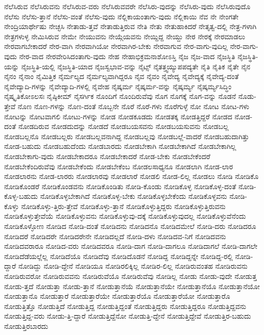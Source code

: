 {ನೆಲೆಸಿರುವ
ನೆಲೆಸಿರುವನು
ನೆಲೆಸಿರುವ-ವರು
ನೆಲೆಸಿರುವವರೇ
ನೆಲೆಸಿರು-ವುದನ್ನು
ನೆಲೆಸಿರು-ವುದು
ನೆಲೆಸಿರುವುದೊ
ನೆಲೆಸು
ನೆಲೆಸು-ತ್ತಾನೆ
ನೆಲೆಸು-ವಂತೆ
ನೆಲೆಸು-ವುದು
ನೆಲ್ಲಿಕಾಯಂತಾಗು-ವುದು
ನೆಲ್ಲಿಕಾಯಿ
ನೆವ
ನೇ
ನೇಂಗತೇ
ನೇಂದ್ರಿಯಾರ್ಥೇಷು
ನೇಚ್ಛಸಿ
ನೇತಾಡು-ತ್ತವೆ
ನೇತಾಡುತ್ತಿರುವ
ನೇತಿ
ನೇತು
ನೇತುಹಾಕಿದರೆ
ನೇತೃತ್ವ-ದಲ್ಲಿ
ನೇತ್ರ-ಗಳಾಗಿ
ನೇತ್ರಗಳುಳ್ಳ
ನೇಮಿಸಿರುವ
ನೇಮೇ
ನೇಯುವನು
ನೇಯ್ಗೆಯವನು
ನೇಯ್ದಿದ್ದ
ನೇಯ್ದು
ನೇರ
ನೇರಕ್ಕೆ
ನೇರಮಾಡಲು
ನೇರವಾಗಬೇಕಾದರೆ
ನೇರ-ವಾಗಿ
ನೇರವಾಗಿಯೋ
ನೇರವಾಗಿರ-ಬೇಕು
ನೇರವಾಗುವ
ನೇರ-ವಾಗು-ವುದಿಲ್ಲ
ನೇರ-ವಾಗು-ವುದು
ನೇರ-ವಾದ
ನೇರವೇರಿಸಿದಂತಾಗು-ವುದು
ನೇಹ
ನೇಹಾಭಿಕ್ರಮನಾಶೋಽಸ್ತಿ
ನೈಜ
ನೈಜ-ವಾದ
ನೈಜಸ್ಥಿತಿ
ನೈಜಸ್ಥಿತಿ-ಯನ್ನು
ನೈಜಸ್ಥಿತಿ-ಯಲ್ಲಿ
ನೈಜಸ್ಥಿತಿ-ಯಾದ
ನೈಜಸ್ವಭಾವ-ವನ್ನು
ನೈಟ್ಸ್
ನೈತತ್ತ್ವಯ್ಯುಪಪದ್ಯತೇ
ನೈತಿ
ನೈತಿಕ
ನೈತೇ
ನೈನ
ನೈನಂ
ನೈನಾಂ
ನೈಮಿತ್ತಿಕ
ನೈರ್ಮಲ್ಯದ
ನೈರ್ಮಲ್ಯವಾಗಿದ್ದರೂ
ನೈವ
ನೈವಂ
ನೈವೇದ್ಯ
ನೈವೇದ್ಯಕ್ಕೆ
ನೈವೇದ್ಯ-ದಂತೆ
ನೈವೇದ್ಯಾದಿ-ಗಳನ್ನು
ನೈವೇದ್ಯಾದಿ-ಗಳಲ್ಲಿ
ನೈವೇಹ
ನೈಷ್ಕರ್ಮ
ನೈಷ್ಕರ್ಮ-ವನ್ನು
ನೈಷ್ಕರ್ಮ್ಯ
ನೈಷ್ಕರ್ಮ್ಯಸಿದ್ಧಿಂ
ನೈಷ್ಕೃತಿಕೋಽಲಸಃ
ನೈಷ್ಠಿಕೀಮ್
ನೈಸರ್ಗಿಕ
ನೊಂದಿಗೆ
ನೊಂದಿರುವೆವು
ನೊಗ
ನೊಗಕ್ಕೆ
ನೊಗ-ವನ್ನು
ನೊಡನೆ
ನೊಡು-ತ್ತೇವೆ
ನೊಣ
ನೊಣ-ಗಳನ್ನು
ನೊಣ-ದಂತೆ
ನೊಬ್ಬನೇ
ನೊರೆ
ನೊರೆ-ಗಳು
ನೊರೆಗುಳ್ಳೆ
ನೋ
ನೋಟ
ನೋಟ-ಗಳು
ನೋಟನ್ನು
ನೋಟವಾಗಲಿ
ನೋಟು-ಗಳನ್ನು
ನೋಡ
ನೋಡಕೂಡದು
ನೋಡತಕ್ಕ
ನೋಡತ್ತಿದ್ದರೆ
ನೋಡದ
ನೋಡ-ದಂತೆ
ನೋಡದಿರುವ
ನೋಡದುದನ್ನು
ನೋಡದೆ
ನೋಡಬಯಸವನು
ನೋಡಬಯಸುವನು
ನೋಡಬಲ್ಲ
ನೋಡಬಲ್ಲನೊ
ನೋಡಬಲ್ಲರು
ನೋಡಬಲ್ಲವನಾಗಿದ್ದ
ನೋಡಬಲ್ಲವು
ನೋಡಬಲ್ಲೆ-ವಾದರೆ
ನೋಡಬಹುದಾಗಿತ್ತು
ನೋಡ-ಬಹುದು
ನೋಡಬಹುದೆಂದು
ನೋಡಬಾರದು
ನೋಡಬೇಕಾಗಿ
ನೋಡಬೇಕಾಗಿದೆ
ನೋಡಬೇಕಾಗಿಲ್ಲ
ನೋಡಬೇಕಾಗು-ವುದು
ನೋಡಬೇಕಾದರೂ
ನೋಡಬೇಕಾದರೆ
ನೋಡ-ಬೇಕು
ನೋಡಬೇಕೆಂದರೆ
ನೋಡಬೇಕೆಂದಿರುವೆವು
ನೋಡಬೇಕೆಂದು
ನೋಡಬೇಕೆಂಬ
ನೋಡಲಸಾಧ್ಯನೂ
ನೋಡಲಾಗಿ
ನೋಡ-ಲಾರ
ನೋಡಲಾರನು
ನೋಡ-ಲಾರರು
ನೋಡಲಾರವು
ನೋಡಲಾರೆ
ನೋಡಲಿ
ನೋಡ-ಲಿಲ್ಲ
ನೋಡಲು
ನೋಡಿ
ನೋಡಿಕೊ
ನೋಡಿಕೊಂಡರೆ
ನೋಡಿಕೊಂಡವನು
ನೋಡಿಕೊಂಡಿತು
ನೋಡಿ-ಕೊಂಡು
ನೋಡಿಕೊಳ್ಳ
ನೋಡಿಕೊಳ್ಳ-ದಂತೆ
ನೋಡಿ-ಕೊಳ್ಳ-ಬಹುದು
ನೋಡಿಕೊಳ್ಳಬೇಕಾಗಿದೆ
ನೋಡಿಕೊಳ್ಳ-ಬೇಕು
ನೋಡಿಕೊಳ್ಳಬೇಕೆಂದು
ನೋಡಿಕೊಳ್ಳವನು
ನೋಡಿ-ಕೊಳ್ಳು
ನೋಡಿಕೊಳ್ಳು-ತ್ತಿರು-ತ್ತೇವೆ
ನೋಡಿಕೊಳ್ಳು-ತ್ತಾನೆ
ನೋಡಿಕೊಳ್ಳುತ್ತಿದ್ದರು
ನೋಡಿಕೊಳ್ಳುತ್ತಿರುವನು
ನೋಡಿಕೊಳ್ಳುತ್ತೇವೆಯೆ
ನೋಡಿಕೊಳ್ಳುವನು
ನೋಡಿಕೊಳ್ಳುವು-ದಕ್ಕೆ
ನೋಡಿಕೊಳ್ಳುವುದಲ್ಲ
ನೋಡಿಕೊಳ್ಳುವೆನೆಂದು
ನೋಡಿಕೊಳ್ಳೋಣ
ನೋಡಿದ
ನೋಡಿ-ದಂತೆ
ನೋಡಿದನು
ನೋಡಿದನೊ
ನೋಡಿದಮೇಲೆ
ನೋಡಿ-ದರು
ನೋಡಿದರೂ
ನೋಡಿದರೆ
ನೋಡಿದರೇ
ನೋಡಿದರೇನೇ
ನೋಡಿದಲ್ಲದೆ
ನೋಡಿ-ದಳು
ನೋಡಿದವ-ನಿಗೆ
ನೋಡಿದವನು
ನೋಡಿದವರಾರೂ
ನೋಡಿದ-ವರು
ನೋಡಿದವರೂ
ನೋಡಿ-ದಾಗ
ನೋಡಿ-ದಾಗಲೂ
ನೋಡಿದಾಗಲೆ
ನೋಡಿ-ದಾಗಲೇ
ನೋಡಿದೆಡೆಯಲ್ಲೆಲ್ಲ
ನೋಡಿದೆಯೊ
ನೋಡಿದೆವು
ನೋಡಿದೊಡನೆ
ನೋಡಿದ್ದ
ನೋಡಿದ್ದನ್ನೇ
ನೋಡಿದ್ದ-ರಲ್ಲಿ
ನೋಡಿ-ದ್ದಾರೆ
ನೋಡಿದ್ದು
ನೋಡಿ-ದ್ದೇನೆ
ನೋಡಿಯೂ
ನೋಡಿರಲಿಕ್ಕಿಲ್ಲ
ನೋಡಿರ-ಲಿಲ್ಲ
ನೋಡಿರುವಂತಹ
ನೋಡಿರುವನು
ನೋಡಿರುವರೋ
ನೋಡಿರುವವನು
ನೋಡಿರುವೆಯೊ
ನೋಡಿರುವೆವು
ನೋಡಿಲ್ಲ
ನೋಡು
ನೋಡು-ವುದೇ
ನೋಡುತ್ತ
ನೋಡು-ತ್ತದೆ
ನೋಡುತ್ತಾ
ನೋಡು-ತ್ತಾನೆ
ನೋಡುತ್ತಾನೆಯೆ
ನೋಡುತ್ತಾನೆಯೇ
ನೋಡುತ್ತಾನೆಯೊ
ನೋಡುತ್ತಾನೆಯೋ
ನೋಡುತ್ತಾನೊ
ನೋಡುತ್ತಾರೆ
ನೋಡುತ್ತಾರೆಯೇ
ನೋಡುತ್ತಾರೆಯೊ
ನೋಡುತ್ತಾರೆಯೋ
ನೋಡುತ್ತಾರೊ
ನೋಡುತ್ತಿತ್ತೊ
ನೋಡುತ್ತಿದೆ
ನೋಡುತ್ತಿದ್ದ
ನೋಡುತ್ತಿದ್ದಂತೆ
ನೋಡುತ್ತಿದ್ದರು
ನೋಡುತ್ತಿದ್ದರೂ
ನೋಡುತ್ತಿದ್ದವನು
ನೋಡುತ್ತಿದ್ದ-ವರು
ನೋಡು-ತ್ತಿ-ದ್ದಾರೆ
ನೋಡುತ್ತಿದ್ದೆನೋ
ನೋಡುತ್ತಿ-ದ್ದೇನೆ
ನೋಡುತ್ತಿದ್ದೇವೆ
ನೋಡುತ್ತಿರ-ಬಹುದು
ನೋಡುತ್ತಿರಬಾರದು
}
